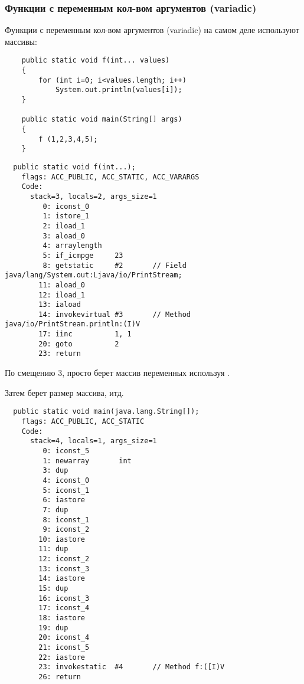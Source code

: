 \subsubsection{Функции с переменным кол-вом аргументов (variadic)}


Функции с переменным кол-вом аргументов (variadic) на самом деле используют массивы:

\begin{lstlisting}
	public static void f(int... values)
	{
		for (int i=0; i<values.length; i++)
			System.out.println(values[i]);
	}

	public static void main(String[] args) 
	{
		f (1,2,3,4,5);
	}
\end{lstlisting}

\begin{lstlisting}
  public static void f(int...);
    flags: ACC_PUBLIC, ACC_STATIC, ACC_VARARGS
    Code:
      stack=3, locals=2, args_size=1
         0: iconst_0      
         1: istore_1      
         2: iload_1       
         3: aload_0       
         4: arraylength   
         5: if_icmpge     23
         8: getstatic     #2       // Field java/lang/System.out:Ljava/io/PrintStream;
        11: aload_0       
        12: iload_1       
        13: iaload        
        14: invokevirtual #3       // Method java/io/PrintStream.println:(I)V
        17: iinc          1, 1
        20: goto          2
        23: return        
\end{lstlisting}


По смещению 3, \ttf просто берет массив переменных используя .

Затем берет размер массива, итд.

\begin{lstlisting}
  public static void main(java.lang.String[]);
    flags: ACC_PUBLIC, ACC_STATIC
    Code:
      stack=4, locals=1, args_size=1
         0: iconst_5      
         1: newarray       int
         3: dup           
         4: iconst_0      
         5: iconst_1      
         6: iastore       
         7: dup           
         8: iconst_1      
         9: iconst_2      
        10: iastore       
        11: dup           
        12: iconst_2      
        13: iconst_3      
        14: iastore       
        15: dup           
        16: iconst_3      
        17: iconst_4      
        18: iastore       
        19: dup           
        20: iconst_4      
        21: iconst_5      
        22: iastore       
        23: invokestatic  #4       // Method f:([I)V
        26: return        
\end{lstlisting}


